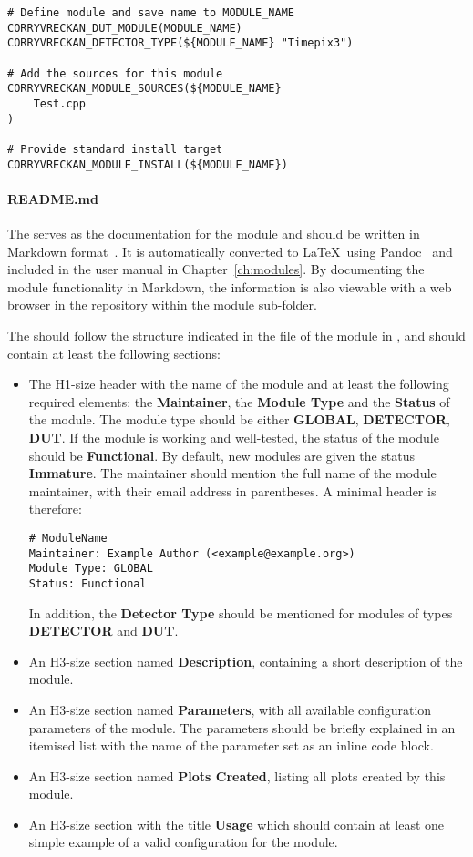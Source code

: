 \begin{verbatim}
# Define module and save name to MODULE_NAME
CORRYVRECKAN_DUT_MODULE(MODULE_NAME)
CORRYVRECKAN_DETECTOR_TYPE(${MODULE_NAME} "Timepix3")

# Add the sources for this module
CORRYVRECKAN_MODULE_SOURCES(${MODULE_NAME}
    Test.cpp
)

# Provide standard install target
CORRYVRECKAN_MODULE_INSTALL(${MODULE_NAME})
\end{verbatim}

\paragraph{README.md}
The  serves as the documentation for the module and should be written in Markdown format~\cite{markdown}.
It is automatically converted to \LaTeX~using Pandoc~\cite{pandoc} and included in the user manual in Chapter~\ref{ch:modules}.
By documenting the module functionality in Markdown, the information is also viewable with a web browser in the repository within the module sub-folder.

The  should follow the structure indicated in the  file of the  module in , and should contain at least the following sections:
\begin{itemize}
\item The H1-size header with the name of the module and at least the following required elements: the \textbf{Maintainer}, the \textbf{Module Type} and the \textbf{Status} of the module.
The module type should be either \textbf{GLOBAL}, \textbf{DETECTOR}, \textbf{DUT}.
If the module is working and well-tested, the status of the module should be \textbf{Functional}.
By default, new modules are given the status \textbf{Immature}.
The maintainer should mention the full name of the module maintainer, with their email address in parentheses.
A minimal header is therefore:
\begin{verbatim}
# ModuleName
Maintainer: Example Author (<example@example.org>)
Module Type: GLOBAL
Status: Functional
\end{verbatim}
In addition, the \textbf{Detector Type} should be mentioned for modules of types \textbf{DETECTOR} and \textbf{DUT}.
\item An H3-size section named \textbf{Description}, containing a short description of the module.
\item An H3-size section named \textbf{Parameters}, with all available configuration parameters of the module.
The parameters should be briefly explained in an itemised list with the name of the parameter set as an inline code block.
\item An H3-size section named \textbf{Plots Created}, listing all plots created by this module.
\item An H3-size section with the title \textbf{Usage} which should contain at least one simple example of a valid configuration for the module.
\end{itemize}

